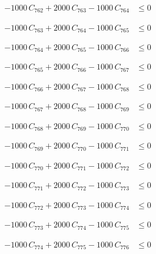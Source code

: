 \documentclass[a4paper,11pt]{article}
\begin{document}
\begin{align}
-1000\,C_{762} + 2000\,C_{763} - 1000\,C_{764} &\leq 0 \nonumber
\end{align}

\begin{align}
-1000\,C_{763} + 2000\,C_{764} - 1000\,C_{765} &\leq 0 \nonumber
\end{align}

\begin{align}
-1000\,C_{764} + 2000\,C_{765} - 1000\,C_{766} &\leq 0 \nonumber
\end{align}

\begin{align}
-1000\,C_{765} + 2000\,C_{766} - 1000\,C_{767} &\leq 0 \nonumber
\end{align}

\begin{align}
-1000\,C_{766} + 2000\,C_{767} - 1000\,C_{768} &\leq 0 \nonumber
\end{align}

\begin{align}
-1000\,C_{767} + 2000\,C_{768} - 1000\,C_{769} &\leq 0 \nonumber
\end{align}

\begin{align}
-1000\,C_{768} + 2000\,C_{769} - 1000\,C_{770} &\leq 0 \nonumber
\end{align}

\begin{align}
-1000\,C_{769} + 2000\,C_{770} - 1000\,C_{771} &\leq 0 \nonumber
\end{align}

\begin{align}
-1000\,C_{770} + 2000\,C_{771} - 1000\,C_{772} &\leq 0 \nonumber
\end{align}

\begin{align}
-1000\,C_{771} + 2000\,C_{772} - 1000\,C_{773} &\leq 0 \nonumber
\end{align}

\begin{align}
-1000\,C_{772} + 2000\,C_{773} - 1000\,C_{774} &\leq 0 \nonumber
\end{align}

\begin{align}
-1000\,C_{773} + 2000\,C_{774} - 1000\,C_{775} &\leq 0 \nonumber
\end{align}

\begin{align}
-1000\,C_{774} + 2000\,C_{775} - 1000\,C_{776} &\leq 0 \nonumber
\end{align}
\end{document}
